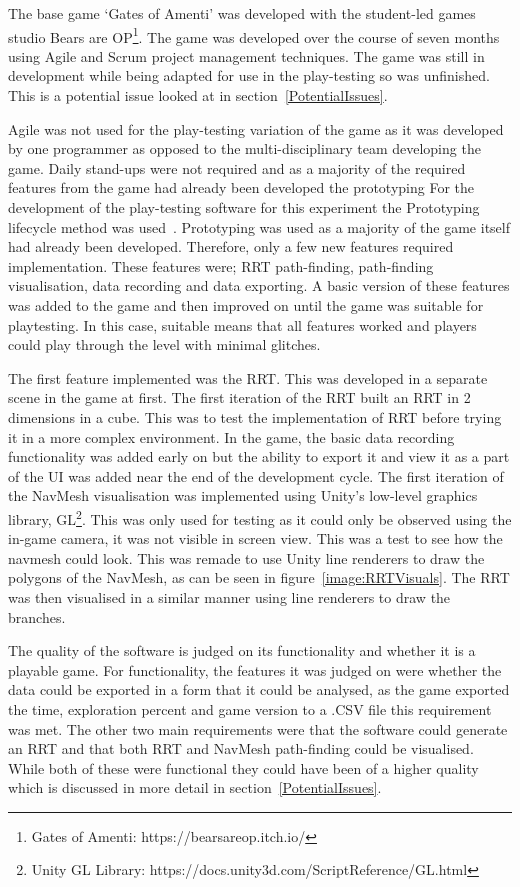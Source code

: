 \documentclass[journal]{IEEEtran}
\begin{document}
	The base game `Gates of Amenti' was developed with the student-led games studio Bears are OP\footnote[5]{Gates of Amenti: https://bearsareop.itch.io/}. The game was developed over the course of seven months using Agile and Scrum project management techniques. The game was still in development while being adapted for use in the play-testing so was unfinished. This is a potential issue looked at in section~\ref{PotentialIssues}. 
	
	Agile was not used for the play-testing variation of the game as it was developed by one programmer as opposed to the multi-disciplinary team developing the game. Daily stand-ups were not required and as a majority of the required features from the game had already been developed the prototyping 
	For the development of the play-testing software for this experiment the Prototyping lifecycle method was used~\cite{isaias2015}. Prototyping was used as a majority of the game itself had already been developed. Therefore, only a few new features required implementation. These features were; RRT path-finding, path-finding visualisation, data recording and data exporting. A basic version of these features was added to the game and then improved on until the game was suitable for playtesting. In this case, suitable means that all features worked and players could play through the level with minimal glitches.  
	
	The first feature implemented was the RRT. This was developed in a separate scene in the game at first. The first iteration of the RRT built an RRT in 2 dimensions in a cube. This was to test the implementation of RRT before trying it in a more complex environment.  In the game, the basic data recording functionality was added early on but the ability to export it and view it as a part of the UI was added near the end of the development cycle. The first iteration of the NavMesh visualisation was implemented using Unity's low-level graphics library, GL\footnote[5]{Unity GL Library: https://docs.unity3d.com/ScriptReference/GL.html}. This was only used for testing as it could only be observed using the in-game camera,  it was not visible in screen view. This was a test to see how the navmesh could look. This was remade to use Unity line renderers to draw the polygons of the NavMesh, as can be seen in figure~\ref{image:RRTVisuals}. The RRT was then visualised in a similar manner using line renderers to draw the branches.   
	
	The quality of the software is judged on its functionality and whether it is a playable game. For functionality, the features it was judged on were whether the data could be exported in a form that it could be analysed, as the game exported the time, exploration percent and game version to a .CSV file this requirement was met. The other two main requirements were that the software could generate an RRT and that both RRT and NavMesh path-finding could be visualised. While both of these were functional they could have been of a higher quality which is discussed in more detail in section~\ref{PotentialIssues}.
	
\end{document}
